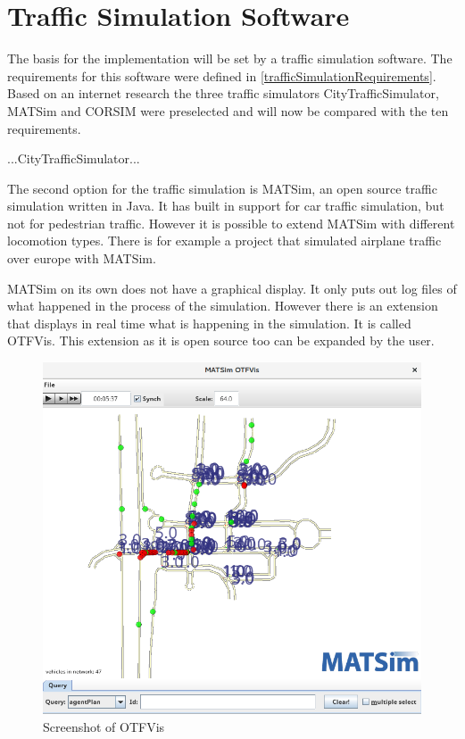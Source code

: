 \section{Traffic Simulation Software}

The basis for the implementation will be set by a traffic simulation software. The requirements for this software were defined in \ref{trafficSimulationRequirements}. Based on an internet research the three traffic simulators CityTrafficSimulator, MATSim and CORSIM were preselected and will now be compared with the ten requirements.

...CityTrafficSimulator...

The second option for the traffic simulation is MATSim, an open source traffic simulation written in Java. It has built in support for car traffic simulation, but not for pedestrian traffic. However it is possible to extend MATSim with different locomotion types. There is for example a project that simulated airplane traffic over europe with MATSim.

MATSim on its own does not have a graphical display. It only puts out log files of what happened in the process of the simulation. However there is an extension that displays in real time what is happening in the simulation. It is called OTFVis. This extension as it is open source too can be expanded by the user.

\begin{figure}[!ht]
  \centering
  \includegraphics[width=12cm]{figures/otfvis}
  \caption[Screenshot of OTFVis]{Screenshot of OTFVis \protect\footnotemark}
  \label{otfvis}
\end{figure}

